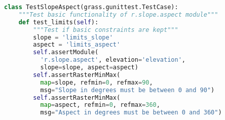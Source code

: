 \documentclass{standalone}
\begin{document}
\begin{lstlisting}[language=Python,linewidth=34.2em]
class TestSlopeAspect(grass.gunittest.TestCase):
    """Test basic functionality of r.slope.aspect module"""
    def test_limits(self):
        """Test if basic constraints are kept"""
        slope = 'limits_slope'
        aspect = 'limits_aspect'
        self.assertModule(
          'r.slope.aspect', elevation='elevation',
          slope=slope, aspect=aspect)
        self.assertRasterMinMax(
          map=slope, refmin=0, refmax=90,
          msg="Slope in degrees must be between 0 and 90")
        self.assertRasterMinMax(
          map=aspect, refmin=0, refmax=360,
          msg="Aspect in degrees must be between 0 and 360")
\end{lstlisting}
\end{document}
